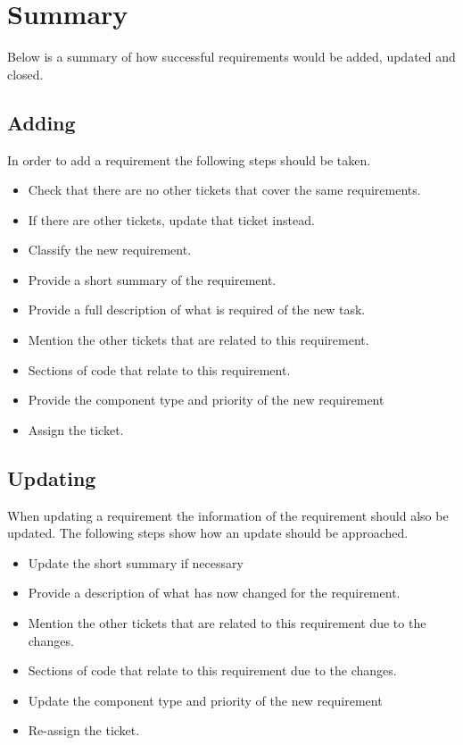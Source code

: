 \documentclass{article}
\begin{document}
\newpage{}
\section{Summary}
Below is a summary of how successful requirements would be added, updated and closed.
\subsection{Adding}
In order to add a requirement the following steps should be taken.
\begin{itemize}
\item Check that there are no other tickets that cover the same requirements.
\item If there are other tickets, update that ticket instead.
\item Classify the new requirement.
\item Provide a short summary of the requirement.
\item Provide a full description of what is required of the new task.
\item Mention the other tickets that are related to this requirement.
\item Sections of code that relate to this requirement.
\item Provide the component type and priority of the new requirement
\item Assign the ticket.
\end{itemize}
	
\subsection{Updating}
When updating a requirement the information of the requirement should also be updated. The following steps show how an update should be approached.
\begin{itemize}
\item Update the short summary if necessary
\item Provide a description of what has now changed for the requirement.
\item Mention the other tickets that are related to this requirement due to the changes.
\item Sections of code that relate to this requirement due to the changes.
\item Update the component type and priority of the new requirement
\item Re-assign the ticket.
\end{itemize}
\end{document}
